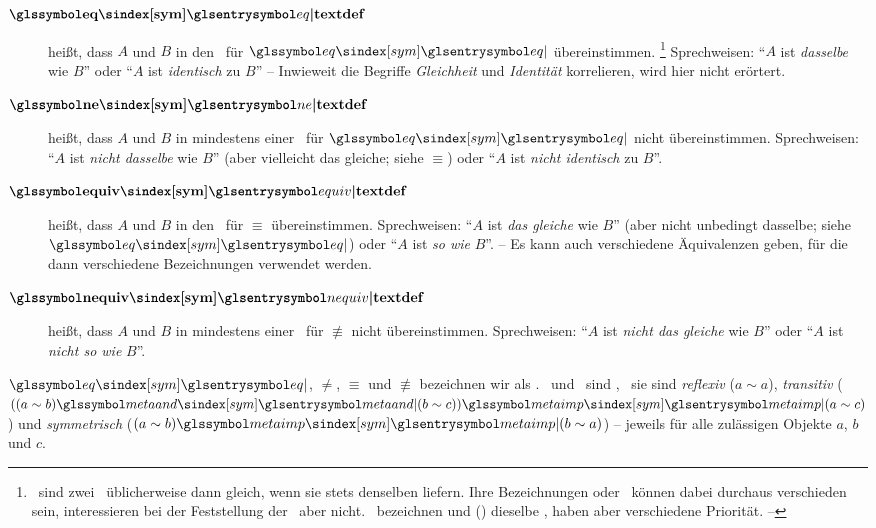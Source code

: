 \begin{description}
	\item[$\definition{\symeq}$]  \label{def-Gleichheit}
	 heißt, dass $A$ und $B$ in den \interessierendenEigenschaften\ für $\symeq$ übereinstimmen.%
	\footnote{%
		\textZB\ sind zwei \Junktoren\ üblicherweise dann gleich, wenn sie stets denselben \emph{\Wahrheitswert} liefern.
		Ihre Bezeichnungen oder \Symbole\ können dabei durchaus verschieden sein, interessieren bei der Feststellung der \Gleichheit\ aber nicht.
		\textZB\ bezeichnen \chrqt{\symmetaand} und \chrqt{\symsrand} () dieselbe \Operation, haben aber verschiedene Priorität. -- 
	}
	Sprechweisen: \enquote{$A$ ist \emph{dasselbe} wie $B$} oder \enquote{$A$ ist \emph{identisch} zu $B$}
	-- Inwieweit die Begriffe \emph{Gleichheit} und \emph{Identität} korrelieren, wird hier nicht erörtert.
	\item[$\definition{\symne}$]  \label{def-Ungleichheit}
	 heißt, dass $A$ und $B$ in mindestens einer \interessierendenEigenschaft\ für $\symeq$ nicht übereinstimmen.
	Sprechweisen: \enquote{$A$ ist \emph{nicht dasselbe} wie $B$} (aber vielleicht das gleiche; siehe $\equiv$) oder \enquote{$A$ ist \emph{nicht identisch} zu $B$}.
	\item[$\definition{\symequiv}$]  \label{def-Aequivalenz}
	 heißt, dass $A$ und $B$ in den \interessierendenEigenschaften\ für $\equiv$ übereinstimmen.
	Sprechweisen: \enquote{$A$ ist \emph{das gleiche} wie $B$} (aber nicht unbedingt dasselbe; siehe $\symeq$) oder \enquote{$A$ ist \emph{so wie} $B$}.
	-- Es kann auch verschiedene Äquivalenzen geben, für die dann verschiedene Bezeichnungen verwendet werden.
	\item[$\definition{\symnequiv}$]  \label{def-Kontravalenz}
	 heißt, dass $A$ und $B$ in mindestens einer \interessierendenEigenschaft\ für $\nequiv$ nicht übereinstimmen.
	Sprechweisen: \enquote{$A$ ist \emph{nicht das gleiche} wie $B$} oder \enquote{$A$ ist \emph{nicht so wie} $B$}.
\end{description}

$\symeq$, $\ne$, $\equiv$ und $\nequiv$ bezeichnen wir als  .
\Gleichheit\ und \Aequivalenz\ sind , \textdh\ sie sind \emph{reflexiv} ($a \sim a$), \emph{transitiv} ($((a \sim b) \symmetaand (b \sim c)) \symmetaimp (a \sim c)$) und \emph{symmetrisch} ($(a \sim b) \symmetaimp (b \sim a)$)
-- jeweils für alle zulässigen Objekte $a$, $b$ und $c$.


